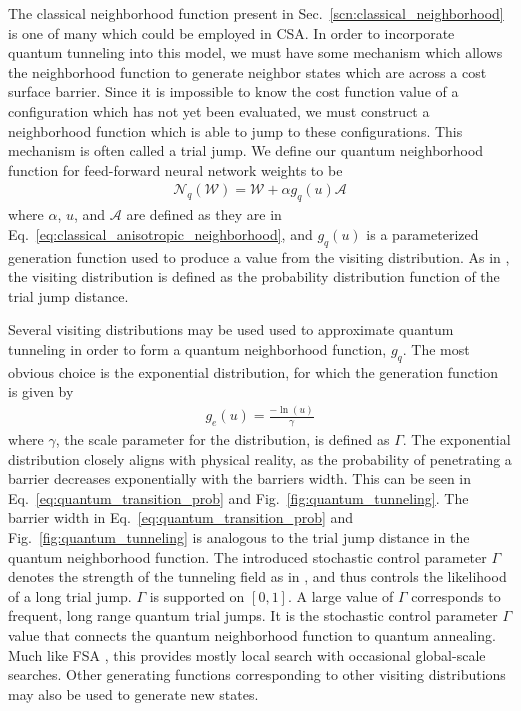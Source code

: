 \documentclass[10pt,journal,cspaper,compsoc]{IEEEtran}
\begin{document}
The classical neighborhood function present in Sec.~\ref{scn:classical_neighborhood} is one of many which could be employed in CSA. In order to incorporate quantum tunneling into this model, we must have some mechanism which allows the neighborhood function to generate neighbor states which are across a cost surface barrier. Since it is impossible to know the cost function value of a configuration which has not yet been evaluated, we must construct a neighborhood function which is able to jump to these configurations. This mechanism is often called a trial jump. We define our quantum neighborhood function for feed-forward neural network weights to be
\begin{align}\label{eq:quantum_anisotropic_neighborhood}
\mathcal{N}_{q} (\boldsymbol{\mathcal{W}}) = \boldsymbol{\mathcal{W}} + \alpha g_{q}(u) \boldsymbol{\mathcal{A}} 
\end{align}
\noindent where $\alpha$, $u$, and $\boldsymbol{\mathcal{A}}$ are defined as they are in Eq.~\ref{eq:classical_anisotropic_neighborhood}, and $g_{q}(u)$ is a parameterized generation function used to produce a value from the visiting distribution. As in \cite{tsallis1996generalizedsimulatedannealing}, the visiting distribution is defined as the probability distribution function of the trial jump distance. 

Several visiting distributions may be used used to approximate quantum tunneling in order to form a quantum neighborhood function, $g_{q}$. The most obvious choice is the exponential distribution, for which the generation function is given by
\begin{align}\label{eq:exp_generation_fcn}
g_{e}(u) =  \frac{-\ln(u)}{\gamma}
\end{align}
\noindent where $\gamma$, the scale parameter for the distribution, is defined as $\Gamma$. The exponential distribution closely aligns with physical reality, as the probability of penetrating a barrier decreases exponentially with the barriers width. This can be seen in Eq.~\ref{eq:quantum_transition_prob} and Fig.~\ref{fig:quantum_tunneling}. The barrier width in Eq.~\ref{eq:quantum_transition_prob} and Fig.~\ref{fig:quantum_tunneling} is analogous to the trial jump distance in the quantum neighborhood function. The introduced stochastic control parameter $\Gamma$ denotes the strength of the tunneling field as in \cite{mukherjee2015multivariatesearchqa}, and thus controls the likelihood of a long trial jump. $\Gamma$ is supported on $[0,1]$. A large value of $\Gamma$ corresponds to frequent, long range quantum trial jumps. It is the stochastic control parameter $\Gamma$ value that connects the quantum neighborhood function to quantum annealing. Much like FSA \cite{szu1987fastsimulatedannealing}, this provides mostly local search with occasional global-scale searches. Other generating functions corresponding to other visiting distributions may also be used to generate new states. 
\end{document}
